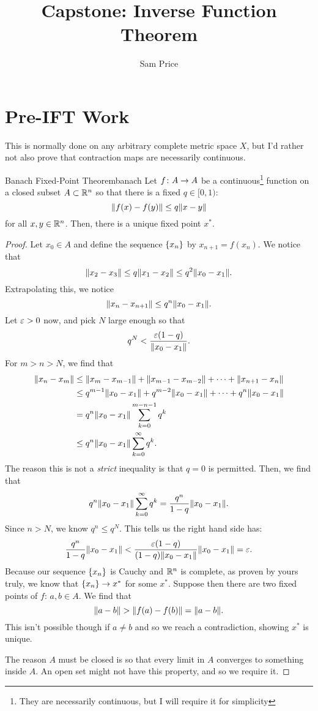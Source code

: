 \documentclass{article}
\author{Sam Price}
\title{Capstone: Inverse Function Theorem}
\begin{document}
\maketitle

\section{Pre-IFT Work}

This is normally done on any arbitrary complete metric space $X$, but I'd rather not also prove that contraction maps are necessarily continuous.
\begin{theorem}{Banach Fixed-Point Theorem}{banach}
  Let $f \from A \to A$ be a continuous\footnote{They are necessarily continuous, but I will require it for simplicity}
  function on a closed subset $A \subset \RR[n]$ so that there is a fixed $q \in \lbrack 0, 1 \rparen$:
  \[ \norm{f(x) - f(y)} \le q\norm{x - y} \]
  for all $x, y \in \RR[n]$.
  Then, there is a unique fixed point $x^{*}$.
\end{theorem}
\begin{proof}
  Let $x_{0} \in A$ and define the sequence $\set{x_{n}}$ by $x_{n + 1} = f(x_{n})$.
  We notice that
  \[ \norm{x_{2} - x_{3}} \le q\norm{x_{1} - x_{2}} \le q^{2}\norm{x_{0} - x_{1}}. \]
  Extrapolating this, we notice
  \[ \norm{x_{n} - x_{n + 1}} \le q^{n}\norm{x_{0} - x_{1}}. \]
  Let $\eps > 0$ now, and pick $N$ large enough so that
  \[ q^{N} < \frac{\eps(1 - q)}{\norm{x_{0} - x_{1}}}. \]
  For $m > n > N$, we find that
  \begin{align*}
    \norm{x_{n} - x_{m}} &\le \norm{x_{m} - x_{m - 1}} + \norm{x_{m - 1} - x_{m - 2}} + \cdots + \norm{x_{n + 1} - x_{n}}\\
    &\le q^{m - 1}\norm{x_{0} - x_{1}} + q^{m - 2}\norm{x_{0} - x_{1}} + \cdots + q^{n}\norm{x_{0} - x_{1}}\\
    &= q^{n}\norm{x_{0} - x_{1}} \sum_{k = 0}^{m - n - 1}q^{k}\\
    &\le q^{n}\norm{x_{0} - x_{1}} \sum_{k = 0}^{\infty}q^{k}.
  \end{align*}
  The reason this is not a \emph{strict} inequality is that $q = 0$ is permitted.
  Then, we find that
  \[
    q^{n}\norm{x_{0} - x_{1}} \sum_{k = 0}^{\infty}q^{k} = \frac{q^{n}}{1 - q}\norm{x_{0} - x_{1}}.
  \]
  Since $n > N$, we know $q^{n} \le q^{N}$. This tells us the right hand side has:
  \[ \frac{q^{n}}{1 - q}\norm{x_{0} - x_{1}} < \frac{\eps(1 - q)}{(1 - q)\norm{x_{0} - x_{1}}}\norm{x_{0} - x_{1}} = \eps. \]
  Because our sequence $\set{x_{n}}$ is Cauchy and $\RR[n]$ is complete, as proven by yours truly, we know that $\set{x_{n}} \to x^{*}$ for some $x^{*}$.
  Suppose then there are two fixed points of $f$: $a, b \in A$. We find that
  \[ \norm{a - b} > \norm{f(a) - f(b)} = \norm{a - b}. \]
  This isn't possible though if $a \ne b$ and so we reach a contradiction, showing $x^{*}$ is unique.

  The reason $A$ must be closed is so that every limit in $A$ converges to something inside $A$.
  An open set might not have this property, and so we require it.
\end{proof}
\end{document}
